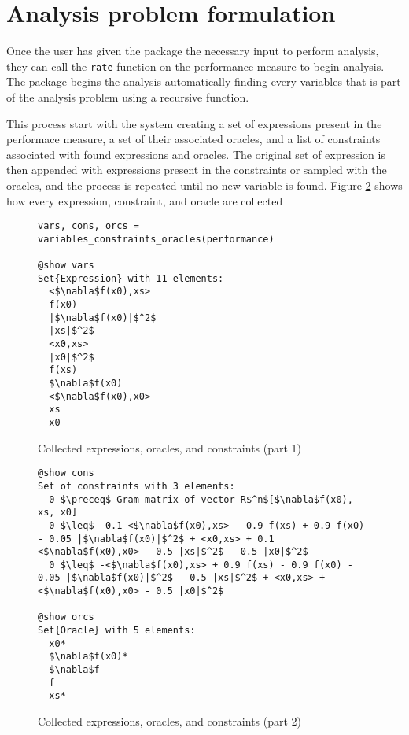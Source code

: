 \section{Analysis problem formulation} \label{sec_collect}

Once the user has given the package the necessary input to perform analysis, they can call the \texttt{rate} function on the performance measure to begin analysis. The package begins the analysis automatically finding every variables that is part of the analysis problem using a recursive function.

This process start with the system creating a set of expressions present in the performace measure, a set of their associated oracles, and a list of constraints associated with found expressions and oracles. The original set of expression is then appended with expressions present in the constraints or sampled with the oracles, and the process is repeated until no new variable is found. Figure \ref*{ex_collect} shows how every expression, constraint, and oracle are collected 

\begin{figure}[h!]
    \begin{lstlisting}[mathescape]
vars, cons, orcs = variables_constraints_oracles(performance)

@show vars
Set{Expression} with 11 elements:
  <$\nabla$f(x0),xs>
  f(x0)
  |$\nabla$f(x0)|$^2$
  |xs|$^2$
  <x0,xs>
  |x0|$^2$
  f(xs)
  $\nabla$f(x0)
  <$\nabla$f(x0),x0>
  xs
  x0
\end{lstlisting}
\caption{Collected expressions, oracles, and constraints (part 1)}
\label{ex_collect}
\end{figure}

\begin{figure}[H]
\ContinuedFloat
\begin{lstlisting}[mathescape]
@show cons
Set of constraints with 3 elements:
  0 $\preceq$ Gram matrix of vector R$^n$[$\nabla$f(x0), xs, x0]
  0 $\leq$ -0.1 <$\nabla$f(x0),xs> - 0.9 f(xs) + 0.9 f(x0) - 0.05 |$\nabla$f(x0)|$^2$ + <x0,xs> + 0.1 <$\nabla$f(x0),x0> - 0.5 |xs|$^2$ - 0.5 |x0|$^2$
  0 $\leq$ -<$\nabla$f(x0),xs> + 0.9 f(xs) - 0.9 f(x0) - 0.05 |$\nabla$f(x0)|$^2$ - 0.5 |xs|$^2$ + <x0,xs> + <$\nabla$f(x0),x0> - 0.5 |x0|$^2$

@show orcs
Set{Oracle} with 5 elements:
  x0*
  $\nabla$f(x0)*
  $\nabla$f
  f
  xs*
\end{lstlisting}    
\caption{Collected expressions, oracles, and constraints (part 2)}
\label{ex_collect}
\end{figure}

